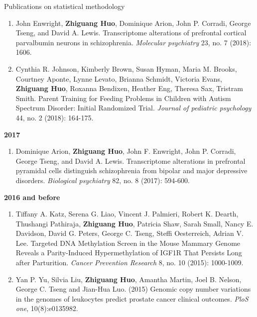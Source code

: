 \documentclass{resume} %
\begin{document}
\begin{rSection}{Publications on statistical methodology}
\begin{enumerate}[noitemsep,topsep=0pt, resume]
\item 
John Enwright, {\bf Zhiguang Huo}, Dominique Arion, John P. Corradi, George Tseng, and David A. Lewis. 
Transcriptome alterations of prefrontal cortical parvalbumin neurons in schizophrenia. 
\emph{Molecular psychiatry} 23, no. 7 (2018): 1606.
    \label{bioinfo_4}


\item 
Cynthia R. Johnson, Kimberly Brown, Susan Hyman, Maria M. Brooks, Courtney Aponte, Lynne Levato, Brianna Schmidt,
Victoria Evans, {\bf Zhiguang Huo},  Roxanna Bendixen, Heather Eng, Theresa Sax, Tristram Smith.
Parent Training for Feeding Problems in Children with Autism Spectrum Disorder: Initial Randomized Trial. \emph{Journal of pediatric psychology} 44, no. 2 (2018): 164-175.

\end{enumerate}

\textbf{2017}
\begin{enumerate}[noitemsep,topsep=0pt, resume]

\item  
Dominique Arion, {\bf Zhiguang Huo}, John F. Enwright, John P. Corradi, George Tseng, and David A. Lewis. Transcriptome alterations in prefrontal pyramidal cells distinguish schizophrenia from bipolar and major depressive disorders. \emph{Biological psychiatry} 82, no. 8 (2017): 594-600.
    \label{bioinfo_3}

\end{enumerate}



\textbf{2016 and before}
\begin{enumerate}[noitemsep,topsep=0pt,resume]

    \item Tiffany A. Katz, Serena G. Liao, Vincent J. Palmieri, Robert K. Dearth, Thushangi Pathiraja, {\bf Zhiguang Huo}, Patricia Shaw, Sarah Small, Nancy E. Davidson, David G. Peters, George C. Tseng, Steffi Oesterreich, Adrian V. Lee. Targeted DNA Methylation Screen in the Mouse Mammary Genome Reveals a Parity-Induced Hypermethylation of IGF1R That Persists Long after Parturition. \emph{Cancer Prevention Research} 8, no. 10 (2015): 1000-1009.
    \label{bioinfo_2}

    \item Yan P. Yu, Silvia Liu, {\bf Zhiguang Huo}, Amantha Martin, Joel B. Nelson, George C. Tseng and Jian-Hua Luo. (2015) Genomic copy number variations in the genomes of leukocytes predict prostate cancer clinical outcomes. \emph{PloS one}, 10(8):e0135982.
    \label{mlapp_1} \label{bioinfo_1}
\end{enumerate}


\end{rSection}
\end{document}
